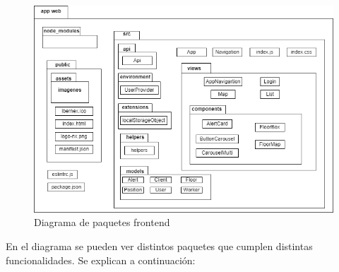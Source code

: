 \begin{figure}[H]
    \centering
    \includegraphics[width=12cm]{Imagenes/Diagrama-paquetes-frontend}
    \caption{Diagrama de paquetes frontend}
    \label{fig:paquetes-frontend}
\end{figure}


En el diagrama se pueden ver distintos paquetes que cumplen distintas funcionalidades. Se explican a continuación:


